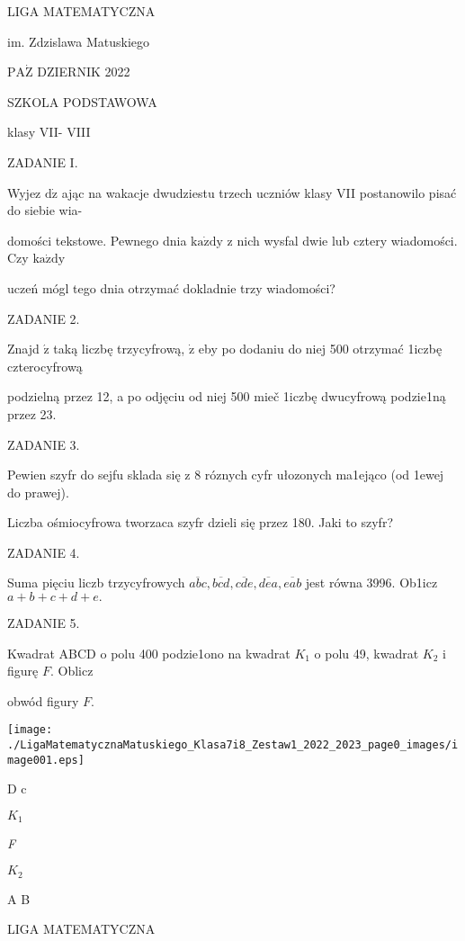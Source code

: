 \documentclass[a4paper,12pt]{article}
\begin{document}
LIGA MATEMATYCZNA

im. Zdzislawa Matuskiego

$\mathrm{P}\mathrm{A}\dot{\mathrm{Z}}$ DZIERNIK 2022

SZKOLA PODSTAWOWA

klasy VII- VIII

ZADANIE I.

Wyjez $\mathrm{d}\dot{\mathrm{z}}$ ając na wakacje dwudziestu trzech uczniów klasy VII postanowilo pisać do siebie wia-

domości tekstowe. Pewnego dnia $\mathrm{k}\mathrm{a}\dot{\mathrm{z}}\mathrm{d}\mathrm{y}$ z nich wysfal dwie lub cztery wiadomości. Czy $\mathrm{k}\mathrm{a}\dot{\mathrm{z}}\mathrm{d}\mathrm{y}$

uczeń mógl tego dnia otrzymać dokladnie trzy wiadomości?

ZADANIE 2.

Znajd $\acute{\mathrm{z}}$ taką liczbę trzycyfrową, $\dot{\mathrm{z}}$ eby po dodaniu do niej 500 otrzymać 1iczbę czterocyfrową

podzielną przez 12, a po odjęciu od niej 500 mieč 1iczbę dwucyfrową podzie1ną przez 23.

ZADANIE 3.

Pewien szyfr do sejfu sklada się z 8 róznych cyfr ułozonych ma1ejąco (od 1ewej do prawej).

Liczba ośmiocyfrowa tworzaca szyfr dzieli się przez 180. Jaki to szyfr?

ZADANIE 4.

Suma pięciu liczb trzycyfrowych $\overline{abc}, \overline{bcd}, \overline{cde}, \overline{dea}, \overline{eab}$ jest równa 3996. Ob1icz $a+b+c+d+e.$

ZADANIE 5.

Kwadrat ABCD o polu 400 podzie1ono na kwadrat $K_{1}$ o polu 49, kwadrat $K_{2}$ i figurę $F$. Oblicz

obwód figury $F.$
\begin{center}
\texttt{[image: ./LigaMatematycznaMatuskiego\_Klasa7i8\_Zestaw1\_2022\_2023\_page0\_images/image001.eps]}
\end{center}
D  c

$K_{1}$

{\it F}

$K_{2}$

A  B






LIGA MATEMATYCZNA
\end{document}
